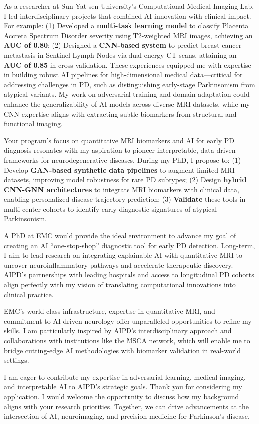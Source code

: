 \documentclass[11pt,a4paper, final]{moderncv}
\begin{document}
As a researcher at Sun Yat-sen University's Computational Medical Imaging Lab, 
I led interdisciplinary projects that combined AI innovation with clinical impact. 
For example: 
(1) Developed a \textbf{multi-task learning model} to classify Placenta Accreta Spectrum Disorder severity using T2-weighted MRI images, achieving an \textbf{AUC of 0.80}; 
(2) Designed a \textbf{CNN-based system} to predict breast cancer metastasis in Sentinel Lymph Nodes via dual-energy CT scans, attaining an \textbf{AUC of 0.85} in cross-validation.
These experiences equipped me with expertise in building robust AI pipelines for high-dimensional medical data—critical for addressing challenges in PD, 
such as distinguishing early-stage Parkinsonism from atypical variants. 
My work on adversarial training and domain adaptation could enhance the generalizability of AI models across diverse MRI datasets, 
while my CNN expertise aligns with extracting subtle biomarkers from structural and functional imaging.

Your program's focus on quantitative MRI biomarkers and AI for early PD diagnosis resonates with my aspiration to pioneer interpretable, data-driven frameworks for neurodegenerative diseases. 
During my PhD, I propose to: 
(1) Develop \textbf{GAN-based synthetic data pipelines} to augment limited MRI datasets, improving model robustness for rare PD subtypes; 
(2) Design \textbf{hybrid CNN-GNN architectures} to integrate MRI biomarkers with clinical data, enabling personalized disease trajectory prediction; 
(3) \textbf{Validate} these tools in multi-center cohorts to identify early diagnostic signatures of atypical Parkinsonism.

A PhD at EMC would provide the ideal environment to advance my goal of creating an AI “one-stop-shop” diagnostic tool for early PD detection. 
Long-term, I aim to lead research on integrating explainable AI with quantitative MRI to uncover neuroinflammatory pathways and accelerate therapeutic discovery. 
AIPD's partnerships with leading hospitals and access to longitudinal PD cohorts align perfectly with my vision of translating computational innovations into clinical practice.

EMC's world-class infrastructure, expertise in quantitative MRI, and commitment to AI-driven neurology offer unparalleled opportunities to refine my skills. 
I am particularly inspired by AIPD's interdisciplinary approach and collaborations with institutions like the MSCA network, 
which will enable me to bridge cutting-edge AI methodologies with biomarker validation in real-world settings.

I am eager to contribute my expertise in adversarial learning, medical imaging, and interpretable AI to AIPD's strategic goals. 
Thank you for considering my application. 
I would welcome the opportunity to discuss how my background aligns with your research priorities. 
Together, we can drive advancements at the intersection of AI, neuroimaging, and precision medicine for Parkinson's disease.

\makeletterclosing
\end{document}
